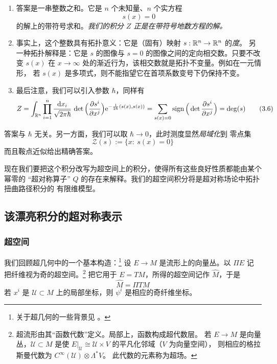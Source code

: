 \begin{enumerate}
\item 答案是一串整数之和。它是 $n$ 个未知量、$n$ 个实方程
  \begin{equation}
  s(x) = 0
  \tag{3.5}
  \end{equation}
  的解上的带符号求和。\emph{我们的积分 $Z$ 正是在带符号地数方程的解。}
\item 事实上，这个整数具有拓扑意义：它是（固有）映射 $s:\mathbb{R}^n\to\mathbb{R}^n$ 的\emph{度}。
  另一种拓扑解释是：它是 $s$ 的图像与 $s=0$ 的图像之间的定向相交数。只要不改变
  $s(x)$ 在 $x\to\infty$ 处的渐近行为，该相交数就是拓扑不变量。例如在一元情形，
  若 $s(x)$ 是多项式，则不能指望它在首项系数变号下仍保持不变。
\item 最后注意，我们可以引入参数 $\hbar$，同样有
  \begin{equation}
  Z = \int_{\mathbb{R}^n}\prod_{i=1}^{n}\frac{\mathrm{d} x_i}{\sqrt{2\pi\hbar}}\,
  \det\Big(\frac{\partial s^i}{\partial x^j}\Big)
  \mathrm{e}^{-\frac{1}{2\hbar}(s(x),s(x))}
  = \sum_{s(x)=0}\operatorname{sign}\Big(\det\frac{\partial s^i}{\partial x^j}\Big)
  = \deg(s)
  \tag{3.6}
  \end{equation}
\end{enumerate}

答案与 $\hbar$ 无关。另一方面，我们可以取 $\hbar\to0$，此时测度显然\emph{局域化}到
零点集
\begin{equation}
\mathcal Z(s) := \{x:\ s(x)=0\}
\tag{3.7}
\end{equation}
而且鞍点近似给出精确答案。

现在我们要把这个积分改写为超空间上的积分，使得所有这些良好性质都能由某个幂零的
“超对称算子” $Q$ 的存在来解释。我们的超空间积分将是超对称场论中拓扑扭曲路径积分的
有限维模型。

\subsection{该漂亮积分的超对称表示}

\subsubsection{超空间}

我们回顾超几何中的一个基本构造：\footnote{关于超几何的一些背景见
\cite{ref6}\cite{ref25}\cite{ref58}。} 设 $E\to M$ 是流形上的向量丛。以 $\Pi E$ 记
把纤维视为奇的超空间。\footnote{超流形由其“函数代数”定义。局部上，函数构成超代数层。
若 $E\to M$ 是向量丛，$\mathcal U\subset M$ 是使
$E|_{\mathcal U}\cong\mathcal U\times V$ 的平凡化邻域（$V$ 为向量空间），
则相应的格拉斯曼代数为 $C^{\infty}(\mathcal U)\otimes\Lambda^{\ast}V$。
此代数的元素称为超场。} 把它用于 $E=TM$，所得的超空间记作 $\widehat M$，于是
\begin{equation}
\widehat M = \Pi TM
\tag{3.8}
\end{equation}
若 $x^i$ 是 $\mathcal U\subset M$ 上的局部坐标，则 $\psi^i$ 是相应的奇纤维坐标。

